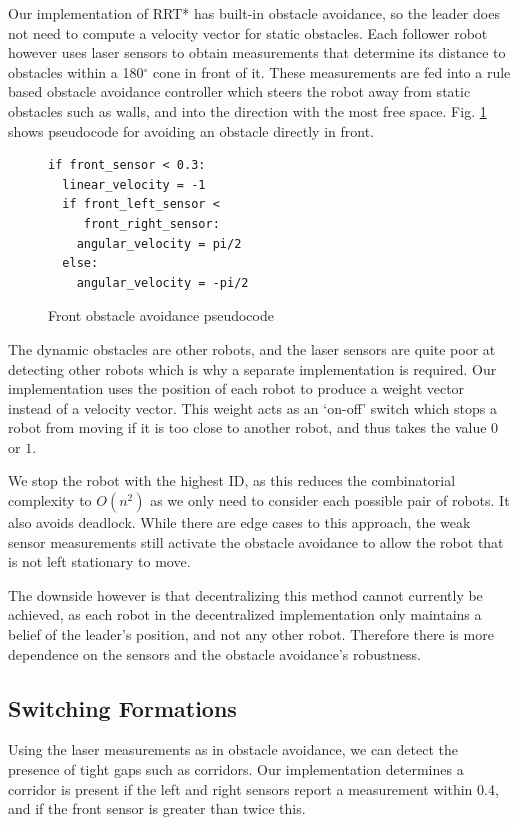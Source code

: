 \documentclass[letterpaper, 10 pt, conference]{ieeeconf}  %
\begin{document}
Our implementation of RRT* has built-in obstacle avoidance, so the leader does not need to compute a velocity vector for static obstacles. Each follower robot however uses laser sensors to obtain measurements that determine its distance to obstacles within a 180$^{\circ}$ cone in front of it. These measurements are fed into a rule based obstacle avoidance controller which steers the robot away from static obstacles such as walls, and into the direction with the most free space.  Fig. \ref{frontrulecode} shows pseudocode for avoiding an obstacle directly in front.

\begin{figure}[thpb]
\centering
\lstset{language=python}
\begin{lstlisting}
if front_sensor < 0.3:
  linear_velocity = -1
  if front_left_sensor <
     front_right_sensor:
    angular_velocity = pi/2
  else:
    angular_velocity = -pi/2
\end{lstlisting}
\caption{Front obstacle avoidance pseudocode}
\label{frontrulecode}
\end{figure}

The dynamic obstacles are other robots, and the laser sensors are quite poor at detecting other robots which is why a separate implementation is required. Our implementation uses the position of each robot to produce a weight vector instead of a velocity vector. This weight acts as an `on-off' switch which stops a robot from moving if it is too close to another robot, and thus takes the value $0$ or $1$.

We stop the robot with the highest ID, as this reduces the combinatorial complexity to $O(n^{2})$ as we only need to consider each possible pair of robots. It also avoids deadlock. While there are edge cases to this approach, the weak sensor measurements still activate the obstacle avoidance to allow the robot that is not left stationary to move.

The downside however is that decentralizing this method cannot currently be achieved, as each robot in the decentralized implementation only maintains a belief of the leader's position, and not any other robot. Therefore there is more dependence on the sensors and the obstacle avoidance's robustness.

\subsection{Switching Formations}

Using the laser measurements as in obstacle avoidance, we can detect the presence of tight gaps such as corridors. Our implementation determines a corridor is present if the left and right sensors report a measurement within 0.4, and if the front sensor is greater than twice this.
\end{document}
